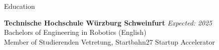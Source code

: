 \documentclass[
	a4paper, %
	10pt, %
]{resume} %
\begin{document}

\begin{rSection}{Education}

	\textbf{Technische Hochschule Würzburg Schweinfurt} \hfill \textit{Expected: 2025} \\
	Bachelors of Engineering in Robotics (English) \\
	Member of Studierenden Vetretung, Startbahn27 Startup Accelerator \\

\end{rSection}

\end{document}
